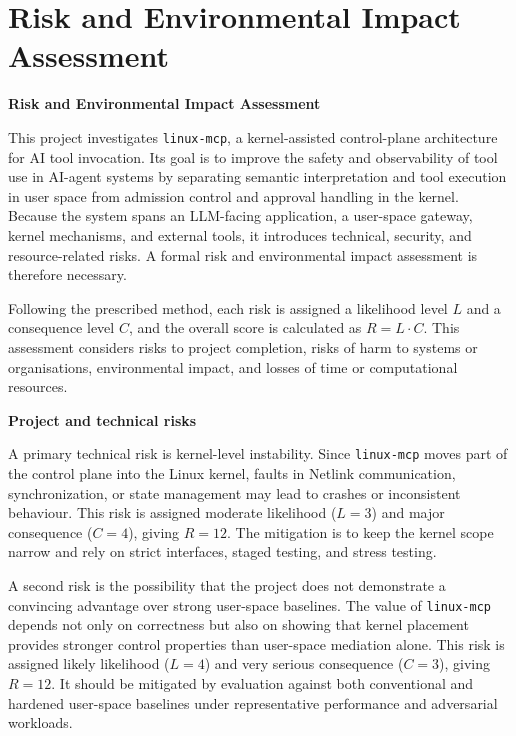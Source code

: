 \section*{Risk and Environmental Impact Assessment}
\setcounter{section}{6} \setcounter{subsection}{0}
 {}


\textbf{Risk and Environmental Impact Assessment}

This project investigates \texttt{linux-mcp}, a kernel-assisted control-plane architecture for AI tool invocation.
Its goal is to improve the safety and observability of tool use in AI-agent systems by separating semantic interpretation and tool execution in user space from admission control and approval handling in the kernel.
Because the system spans an LLM-facing application, a user-space gateway, kernel mechanisms, and external tools, it introduces technical, security, and resource-related risks.
A formal risk and environmental impact assessment is therefore necessary.

Following the prescribed method, each risk is assigned a likelihood level $L$ and a consequence level $C$, and the overall score is calculated as $R = L \cdot C$.
This assessment considers risks to project completion, risks of harm to systems or organisations, environmental impact, and losses of time or computational resources.

\textbf{Project and technical risks}

A primary technical risk is kernel-level instability.
Since \texttt{linux-mcp} moves part of the control plane into the Linux kernel, faults in Netlink communication, synchronization, or state management may lead to crashes or inconsistent behaviour.
This risk is assigned moderate likelihood ($L = 3$) and major consequence ($C = 4$), giving $R = 12$.
The mitigation is to keep the kernel scope narrow and rely on strict interfaces, staged testing, and stress testing.

A second risk is the possibility that the project does not demonstrate a convincing advantage over strong user-space baselines.
The value of \texttt{linux-mcp} depends not only on correctness but also on showing that kernel placement provides stronger control properties than user-space mediation alone.
This risk is assigned likely likelihood ($L = 4$) and very serious consequence ($C = 3$), giving $R = 12$.
It should be mitigated by evaluation against both conventional and hardened user-space baselines under representative performance and adversarial workloads.

